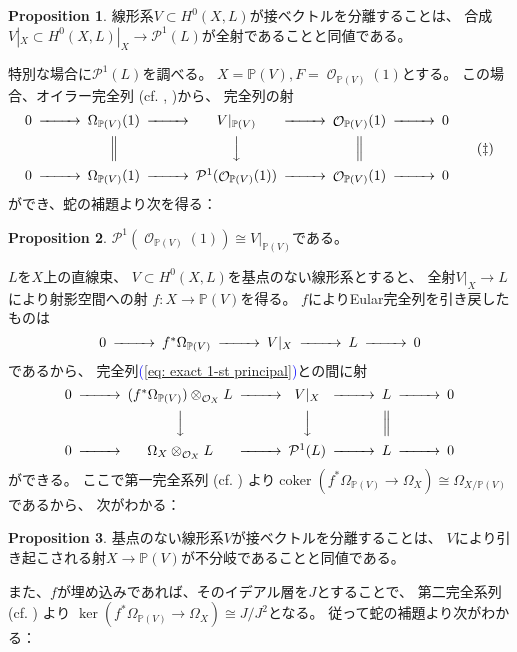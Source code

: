 \documentclass[uplatex]{jsarticle}
\renewcommand{\eqref}[1]{\textcolor{blue}{(\ref{#1})}}
\theoremstyle{definition}
\newtheorem{prop}[prop]{Proposition}
\DeclareMathOperator{\coker}{\mathrm{coker}}
\renewcommand{\P}{\mathbb{P}}
\newcommand{\mcO}{\mathcal{O}}
\newcommand{\mcP}{\mathcal{P}}
\DeclareMathOperator{\OOO}{\mcO}
\newcommand{\OX}{{\OOO_X}}
\newcommand{\OO}[1]{\OOO_{#1}}
\begin{document}
\begin{prop}\label{prop: tan vec sheaf}
  線形系\(V\subset H^0(X,L)\)が接ベクトルを分離することは、
  合成\(V|_X\subset H^0(X,L)|_X\to \mcP^1(L)\)が全射であることと同値である。
\end{prop}

特別な場合に\(\mcP^1(L)\)を調べる。
\(X=\P(V), F=\OO{\P(V)}(1)\)とする。
この場合、オイラー完全列 (cf. \cite[定理 8.13]{Ha}, \cite[Proposition 3]{YJ})から、
完全列の射
\begin{equation}\label{eq: Eular and principal}
  \begin{CD}
    0 @>>> \Omega_{\P(V)}(1) @>>> V|_{\P(V)} @>>> \OO{\P(V)}(1) @>>> 0 \\
    @. @| @VVV @| @. \\
    0 @>>> \Omega_{\P(V)}(1) @>>> \mcP^1(\OO{\P(V)}(1)) @>>> \OO{\P(V)}(1) @>>> 0
  \end{CD}
  \tag{\(\ddagger\)}
\end{equation}
ができ、蛇の補題より次を得る：

\begin{prop}
  \(\mcP^1(\OO{\P(V)}(1))\cong V|_{\P(V)}\)である。
\end{prop}


\(L\)を\(X\)上の直線束、
\(V\subset H^0(X,L)\)を基点のない線形系とすると、
全射\(V|_X\to L\)により射影空間への射
\(f:X\to \P(V)\)を得る。
\(f\)によりEular完全列を引き戻したものは
\[
\begin{CD}
  0 @>>> f^*\Omega_{\P(V)} @>>> V|_X @>>> L @>>> 0
\end{CD}
\]
であるから、
完全列\eqref{eq: exact 1-st principal}との間に射
\[
\begin{CD}
  0 @>>> (f^*\Omega_{\P(V)})\otimes_{\OX}L @>>> V|_X @>>> L @>>> 0 \\
  @. @VVV @VVV @| @. \\
  0 @>>> \Omega_X\otimes_{\OX}L @>>> \mcP^1(L) @>>> L @>>> 0
\end{CD}
\]
ができる。
ここで第一完全系列 (cf. \cite[命題 II.8.11]{Ha})
より\(\coker(f^*\Omega_{\P(V)}\to \Omega_X)\cong \Omega_{X/\P(V)}\)であるから、
次がわかる：

\begin{prop}\label{prop: sep tan unramified}
  基点のない線形系\(V\)が接ベクトルを分離することは、
  \(V\)により引き起こされる射\(X\to \P(V)\)が不分岐であることと同値である。
\end{prop}

また、\(f\)が埋め込みであれば、そのイデアル層を\(J\)とすることで、
第二完全系列 (cf. \cite[命題 II.8.12]{Ha}) より
\(\ker(f^*\Omega_{\P(V)}\to \Omega_X)\cong J/J^2\)となる。
従って蛇の補題より次がわかる：
\end{document}
